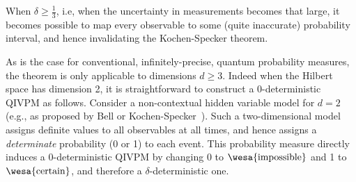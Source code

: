 \documentclass[english,reprint, aps, prl,superscriptaddress, showpacs,
showkeys, longbibliography, amsmath, amssymb, floatfix]{revtex4-1}
\theoremstyle{plain}
\theoremstyle{definition}
\newcommand{\events}{\ensuremath{\mathcal{E}}}
\newcommand{\imposs}{{\text{\wesa{impossible}}}}
\newcommand{\necess}{{\text{\wesa{certain}}}}
\begin{document}
When $\delta \geq \frac{1}{3}$, i.e, when the uncertainty in
measurements becomes that large, it becomes possible to map every
observable to some (quite inaccurate) probability interval, and hence
invalidating the Kochen-Specker theorem.

As is the case for conventional, infinitely-precise, quantum
probability measures, the theorem is only applicable to dimensions
$d \geq 3$. Indeed when the Hilbert space has dimension 2, it is
straightforward to construct a 0-deterministic QIVPM as
follows. Consider a non-contextual hidden variable model for $d=2$
(e.g., as proposed by Bell or
Kochen-Specker~\cite{BELL_1966,kochenspecker1967}). Such a
two-dimensional model assigns definite values to all observables at
all times, and hence assigns a \emph{determinate} probability (0 or 1)
to each event. This probability measure directly induces a
0-deterministic QIVPM by changing 0 to $\imposs$ and 1 to $\necess$,
and therefore a $\delta$-deterministic one.


\end{document}
